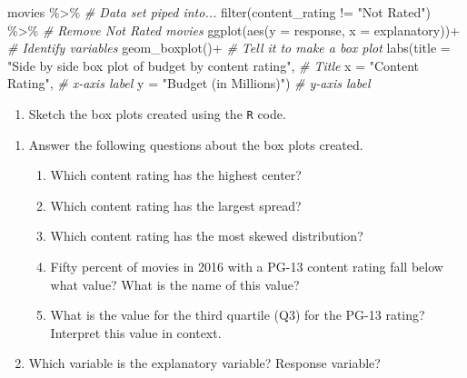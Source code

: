 \documentclass[
]{report}
\newenvironment{Shaded}{\begin{snugshade}}{\end{snugshade}}
\newcommand{\AttributeTok}[1]{\textcolor[rgb]{0.77,0.63,0.00}{#1}}
\newcommand{\CommentTok}[1]{\textcolor[rgb]{0.56,0.35,0.01}{\textit{#1}}}
\newcommand{\FunctionTok}[1]{\textcolor[rgb]{0.00,0.00,0.00}{#1}}
\newcommand{\NormalTok}[1]{#1}
\newcommand{\SpecialCharTok}[1]{\textcolor[rgb]{0.00,0.00,0.00}{#1}}
\newcommand{\StringTok}[1]{\textcolor[rgb]{0.31,0.60,0.02}{#1}}
\providecommand{\tightlist}{%
  \setlength{\itemsep}{0pt}\setlength{\parskip}{0pt}}
\begin{document}
\begin{Shaded}
\begin{Highlighting}[]
\NormalTok{movies }\SpecialCharTok{\%\textgreater{}\%}  \CommentTok{\# Data set piped into...}
  \FunctionTok{filter}\NormalTok{(content\_rating }\SpecialCharTok{!=} \StringTok{"Not Rated"}\NormalTok{) }\SpecialCharTok{\%\textgreater{}\%} \CommentTok{\# Remove Not Rated movies}
  \FunctionTok{ggplot}\NormalTok{(}\FunctionTok{aes}\NormalTok{(}\AttributeTok{y =}\NormalTok{ response, }\AttributeTok{x =}\NormalTok{ explanatory))}\SpecialCharTok{+}  \CommentTok{\# Identify variables}
  \FunctionTok{geom\_boxplot}\NormalTok{()}\SpecialCharTok{+}  \CommentTok{\# Tell it to make a box plot}
  \FunctionTok{labs}\NormalTok{(}\AttributeTok{title =} \StringTok{"Side by side box plot of budget by content rating"}\NormalTok{,  }\CommentTok{\# Title}
       \AttributeTok{x =} \StringTok{"Content Rating"}\NormalTok{,    }\CommentTok{\# x{-}axis label}
       \AttributeTok{y =} \StringTok{"Budget (in Millions)"}\NormalTok{)  }\CommentTok{\# y{-}axis label}
\end{Highlighting}
\end{Shaded}

\begin{enumerate}
\def\labelenumi{\arabic{enumi}.}
\setcounter{enumi}{4}
\tightlist
\item
  Sketch the box plots created using the \texttt{R} code.
\end{enumerate}

\vspace{1.5in}

\begin{enumerate}
\def\labelenumi{\arabic{enumi}.}
\setcounter{enumi}{5}
\item
  Answer the following questions about the box plots created.

  \begin{enumerate}
  \def\labelenumii{\alph{enumii}.}
  \item
    Which content rating has the highest center?
    \vspace{0.2in}
  \item
    Which content rating has the largest spread?
    \vspace{0.2in}
  \item
    Which content rating has the most skewed distribution?
    \vspace{0.2in}
  \item
    Fifty percent of movies in 2016 with a PG-13 content rating fall below what value? What is the name of this value?
    \vspace{0.4in}
  \item
    What is the value for the third quartile (Q3) for the PG-13 rating? Interpret this value in context.
    \vspace{.8in}
  \end{enumerate}
\item
  Which variable is the explanatory variable? Response variable?
\end{enumerate}
\end{document}
